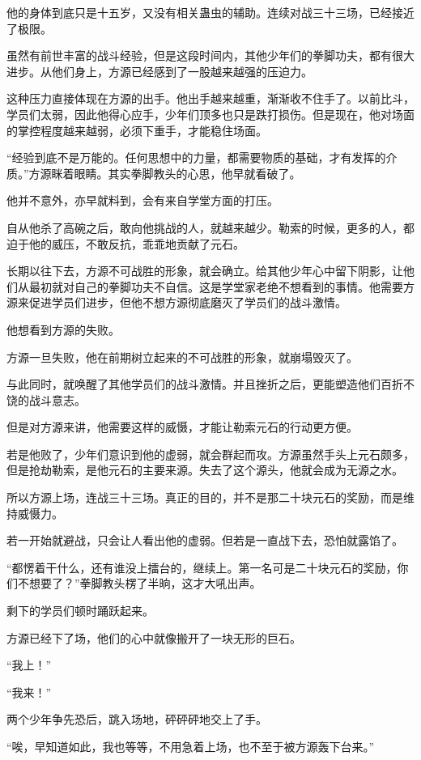 \begin{this_body}
他的身体到底只是十五岁，又没有相关蛊虫的辅助。连续对战三十三场，已经接近了极限。

虽然有前世丰富的战斗经验，但是这段时间内，其他少年们的拳脚功夫，都有很大进步。从他们身上，方源已经感到了一股越来越强的压迫力。

这种压力直接体现在方源的出手。他出手越来越重，渐渐收不住手了。以前比斗，学员们太弱，因此他得心应手，少年们顶多也只是跌打损伤。但是现在，他对场面的掌控程度越来越弱，必须下重手，才能稳住场面。

“经验到底不是万能的。任何思想中的力量，都需要物质的基础，才有发挥的介质。”方源眯着眼睛。其实拳脚教头的心思，他早就看破了。

他并不意外，亦早就料到，会有来自学堂方面的打压。

自从他杀了高碗之后，敢向他挑战的人，就越来越少。勒索的时候，更多的人，都迫于他的威压，不敢反抗，乖乖地贡献了元石。

长期以往下去，方源不可战胜的形象，就会确立。给其他少年心中留下阴影，让他们从最初就对自己的拳脚功夫不自信。这是学堂家老绝不想看到的事情。他需要方源来促进学员们进步，但他不想方源彻底磨灭了学员们的战斗激情。

他想看到方源的失败。

方源一旦失败，他在前期树立起来的不可战胜的形象，就崩塌毁灭了。

与此同时，就唤醒了其他学员们的战斗激情。并且挫折之后，更能塑造他们百折不饶的战斗意志。

但是对方源来讲，他需要这样的威慑，才能让勒索元石的行动更方便。

若是他败了，少年们意识到他的虚弱，就会群起而攻。方源虽然手头上元石颇多，但是抢劫勒索，是他元石的主要来源。失去了这个源头，他就会成为无源之水。

所以方源上场，连战三十三场。真正的目的，并不是那二十块元石的奖励，而是维持威慑力。

若一开始就避战，只会让人看出他的虚弱。但若是一直战下去，恐怕就露馅了。

“都愣着干什么，还有谁没上擂台的，继续上。第一名可是二十块元石的奖励，你们不想要了？”拳脚教头楞了半晌，这才大吼出声。

剩下的学员们顿时踊跃起来。

方源已经下了场，他们的心中就像搬开了一块无形的巨石。

“我上！”

“我来！”

两个少年争先恐后，跳入场地，砰砰砰地交上了手。

“唉，早知道如此，我也等等，不用急着上场，也不至于被方源轰下台来。”


\end{this_body}
